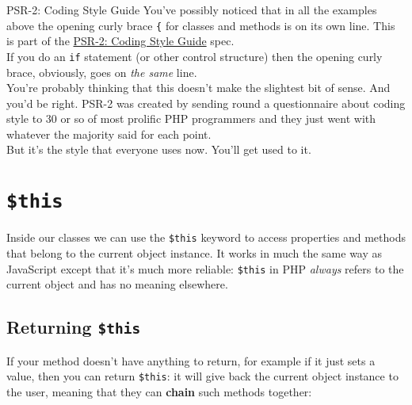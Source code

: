 \begin{infobox}{PSR-2: Coding Style Guide}
    You've possibly noticed that in all the examples above the opening curly brace \texttt{\{} for classes and methods is on its own line. This is part of the \href{https://www.php-fig.org/psr/psr-2/}{PSR-2: Coding Style Guide} spec.
    \\

    If you do an \texttt{if} statement (or other control structure) then the opening curly brace, obviously, goes on \textit{the same} line.
    \\

    You're probably thinking that this doesn't make the slightest bit of sense. And you'd be right. PSR-2 was created by sending round a questionnaire about coding style to 30 or so of most prolific PHP programmers and they just went with whatever the majority said for each point.
    \\

    But it's the style that everyone uses now. You'll get used to it.
\end{infobox}


\section{\texttt{\$this}}

Inside our classes we can use the \texttt{\$this} keyword to access properties and methods that belong to the current object instance. It works in much the same way as JavaScript except that it's much more reliable: \texttt{\$this} in PHP \textit{always} refers to the current object and has no meaning elsewhere.



\subsection{Returning \texttt{\$this}}

If your method doesn't have anything to return, for example if it just sets a value, then you can return \texttt{\$this}: it will give back the current object instance to the user, meaning that they can \textbf{chain} such methods together:



